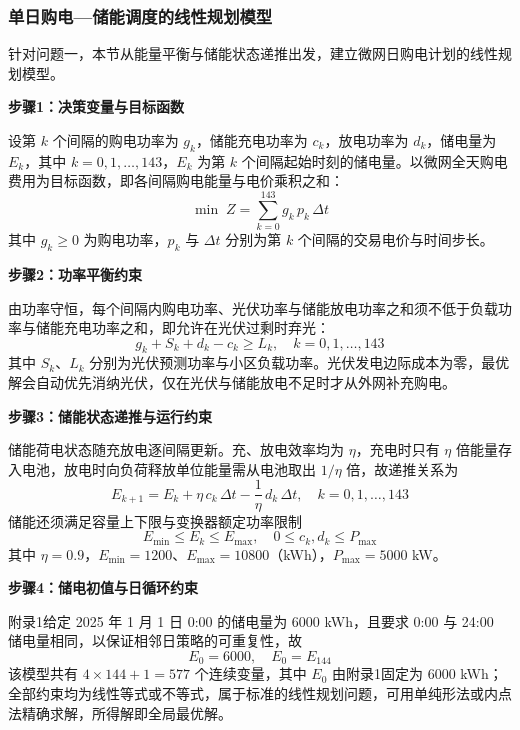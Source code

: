 
\subsubsection{单日购电—储能调度的线性规划模型}

针对问题一，本节从能量平衡与储能状态递推出发，建立微网日购电计划的线性规划模型。

\textbf{步骤1：决策变量与目标函数}

设第 $k$ 个间隔的购电功率为 $g_k$，储能充电功率为 $c_k$，放电功率为 $d_k$，储电量为 $E_k$，其中 $k=0,1,\dots,143$，$E_k$ 为第 $k$ 个间隔起始时刻的储电量。以微网全天购电费用为目标函数，即各间隔购电能量与电价乘积之和：
\begin{equation}
    \min \; Z=\sum_{k=0}^{143} g_k\,p_k\,\Delta t
\end{equation}
其中 $g_k\geq 0$ 为购电功率，$p_k$ 与 $\Delta t$ 分别为第 $k$ 个间隔的交易电价与时间步长。

\textbf{步骤2：功率平衡约束}

由功率守恒，每个间隔内购电功率、光伏功率与储能放电功率之和须不低于负载功率与储能充电功率之和，即允许在光伏过剩时弃光：
\begin{equation}
    g_k + S_k + d_k - c_k \geq L_k,\quad k=0,1,\dots,143
\end{equation}
其中 $S_k$、$L_k$ 分别为光伏预测功率与小区负载功率。光伏发电边际成本为零，最优解会自动优先消纳光伏，仅在光伏与储能放电不足时才从外网补充购电。

\textbf{步骤3：储能状态递推与运行约束}

储能荷电状态随充放电逐间隔更新。充、放电效率均为 $\eta$，充电时只有 $\eta$ 倍能量存入电池，放电时向负荷释放单位能量需从电池取出 $1/\eta$ 倍，故递推关系为
\begin{equation}
    E_{k+1}=E_k+\eta\,c_k\,\Delta t-\frac{1}{\eta}\,d_k\,\Delta t,\quad k=0,1,\dots,143
\end{equation}
储能还须满足容量上下限与变换器额定功率限制
\begin{equation}
    E_{\min}\leq E_k\leq E_{\max},\quad 0\leq c_k,d_k\leq P_{\max}
\end{equation}
其中 $\eta=0.9$，$E_{\min}=1200$、$E_{\max}=10800$（kWh），$P_{\max}=5000$ kW。

\textbf{步骤4：储电初值与日循环约束}

附录1给定 2025 年 1 月 1 日 0:00 的储电量为 6000 kWh，且要求 0:00 与 24:00 储电量相同，以保证相邻日策略的可重复性，故
\begin{equation}
    E_0=6000,\quad E_0=E_{144}
\end{equation}
该模型共有 $4\times 144+1=577$ 个连续变量，其中 $E_0$ 由附录1固定为 6000 kWh；全部约束均为线性等式或不等式，属于标准的线性规划问题\cite{dantzig1963}，可用单纯形法或内点法精确求解，所得解即全局最优解。
